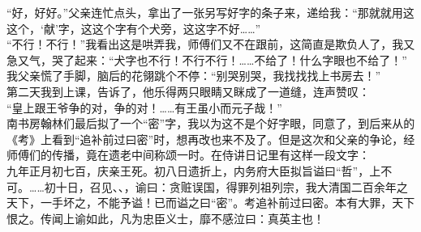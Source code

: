 “好，好好。”父亲连忙点头，拿出了一张另写好字的条子来，递给我：“那就就用这这个，‘献’字，这这个字有个犬旁，这这字不好……”\\

“不行！不行！”我看出这是哄弄我，师傅们又不在跟前，这简直是欺负人了，我又急又气，哭了起来：“犬字也不行！不行不行！……不给了！什么字眼也不给了！”\\

我父亲慌了手脚，脑后的花翎跳个不停：“别哭别哭，我找找找上书房去！”\\

第二天我到上课，告诉了，他乐得两只眼睛又眯成了一道缝，连声赞叹：\\

“皇上跟王爷争的对，争的对！……有王虽小而元子哉！”\\

南书房翰林们最后拟了一个“密”字，我以为这不是个好字眼，同意了，到后来从的《考》上看到“追补前过曰密”时，想再改也来不及了。但是这次和父亲的争论，经师傅们的传播，竟在遗老中间称颂一时。在侍讲日记里有这样一段文字：\\

九年正月初七百，庆亲王死。初八日遗折上，内务府大臣拟旨谥曰“哲”，上不可。……初十日，召见、、，谕曰：贪赃误国，得罪列祖列宗，我大清国二百余年之天下，一手坏之，不能予谥！已而谥之曰“密”。考追补前过曰密。本有大罪，天下恨之。传闻上谕如此，凡为忠臣义士，靡不感泣曰：真英主也！
